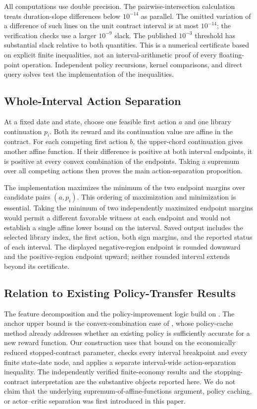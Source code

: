 All computations use double precision. The pairwise-intersection calculation treats duration-slope differences below $10^{-14}$ as parallel. The omitted variation of a difference of such lines on the unit contract interval is at most $10^{-14}$; the verification checks use a larger $10^{-9}$ slack. The published $10^{-3}$ threshold has substantial slack relative to both quantities. This is a numerical certificate based on explicit finite inequalities, not an interval-arithmetic proof of every floating-point operation. Independent policy recursions, kernel comparisons, and direct query solves test the implementation of the inequalities.

\subsection{Whole-Interval Action Separation}
At a fixed date and state, choose one feasible first action $a$ and one library continuation $p_i$. Both its reward and its continuation value are affine in the contract. For each competing first action $b$, the upper-chord continuation gives another affine function. If their difference is positive at both interval endpoints, it is positive at every convex combination of the endpoints. Taking a supremum over all competing actions then proves the main action-separation proposition.

The implementation maximizes the minimum of the two endpoint margins over candidate pairs $(a,p_i)$. This ordering of maximization and minimization is essential. Taking the minimum of two independently maximized endpoint margins would permit a different favorable witness at each endpoint and would not establish a single affine lower bound on the interval. Saved output includes the selected library index, the first action, both sign margins, and the reported status of each interval. The displayed negative-region endpoint is rounded downward and the positive-region endpoint upward; neither rounded interval extends beyond its certificate.

\subsection{Relation to Existing Policy-Transfer Results}
The feature decomposition and the policy-improvement logic build on \citet{barreto2017,chang2021}. The anchor upper bound is the convex-combination case of \citet{nemecek2021}, whose policy-cache method already addresses whether an existing policy is sufficiently accurate for a new reward function. Our construction uses that bound on the economically reduced stopped-contract parameter, checks every interval breakpoint and every finite state-date node, and applies a separate interval-wide action-separation inequality. The independently verified finite-economy results and the stopping-contract interpretation are the substantive objects reported here. We do not claim that the underlying supremum-of-affine-functions argument, policy caching, or actor--critic separation was first introduced in this paper.
